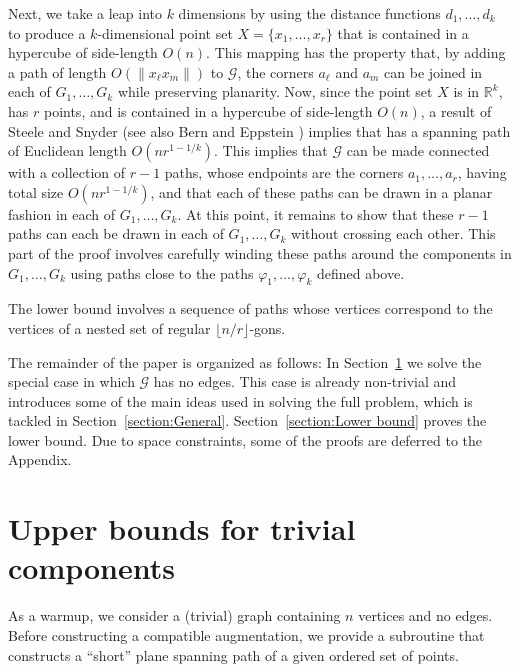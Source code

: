 \documentclass{patmorin}
\newcommand{\etal}{\emph{et al}}
\newcommand{\R}{\mathbb{R}}
\begin{document}
Next, we take a leap into $k$ dimensions by using the distance
functions $d_1,\ldots,d_k$ to produce a $k$-dimensional point set
$X=\{x_1,\ldots,x_r\}$ that is contained in a hypercube of side-length $O(n)$.
This mapping has the property that, by adding a path of length $O(\|x_\ell
x_m\|)$ to $\mathcal G$, the corners $a_\ell$ and $a_m$ can be joined
in each of $G_1,\ldots,G_k$ while preserving planarity.
Now, since the point set $X$ is in $\R^k$, has $r$ points, and
is contained in a hypercube of side-length $O(n)$, a result of Steele
and Snyder \cite{steele.snyder:worst} (see also Bern and Eppstein
\cite{bern.eppstein:worst}) implies that has a spanning path of
Euclidean length $O(nr^{1-1/k})$.  This implies that $\mathcal G$ can be made
connected with a collection of $r-1$ paths, whose endpoints are the
corners $a_1,\ldots,a_r$, having total size $O(nr^{1-1/k})$, and
that each of these paths can be drawn in a planar fashion in each
of $G_1,\ldots,G_k$.
At this point, it remains to show that these $r-1$ paths
can each be drawn in each of $G_1,\ldots,G_k$ without crossing
each other.  This part of the proof involves carefully winding these
paths around the components in $G_1,\ldots,G_k$ using paths close
to the paths $\varphi_1,\ldots,\varphi_k$ defined above.

The lower bound involves a sequence of paths whose vertices correspond to the vertices of
a nested set of regular $\lfloor n/r\rfloor$-gons.

The remainder of the paper is organized as follows: In
Section~\ref{section:Trivial components} we solve the special case in which $\mathcal G$ has no edges. This
case is already non-trivial and introduces some of the
main ideas used in solving the full problem, which is tackled in
Section~\ref{section:General}. Section~\ref{section:Lower bound}
proves the lower bound. Due to space constraints, some of the proofs are deferred to the Appendix.


\section{Upper bounds for trivial components}\label{section:Trivial components}
As a warmup, we consider a (trivial) graph containing $n$ vertices and no edges.
Before constructing a compatible augmentation, we provide a subroutine
that constructs a ``short'' plane spanning path of a given ordered set  of points.
\end{document}
